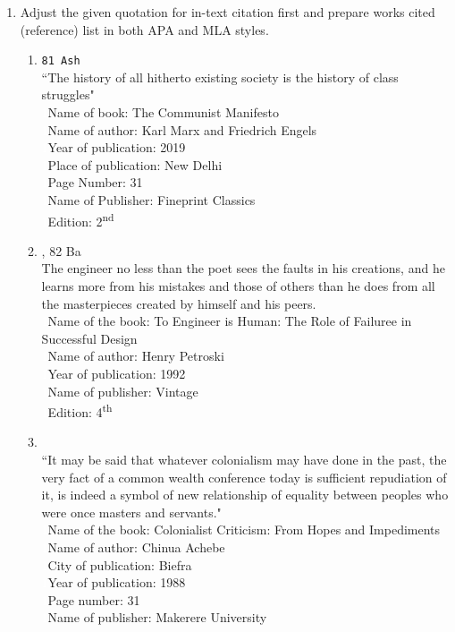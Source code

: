 \documentclass[12pt]{article}
\newcommand{\enter}{\\\textcolor{white}{1}}
\newcommand{\super}[1]{\textsuperscript{#1}}
\begin{document}
\begin{enumerate}
\begin{enumerate}
        \item 76 Ash
          \enter Name of book: Solar energy
          \enter date of publication: 1996
          \enter place of publication: U.K.
          \enter Publisher's name: Prentice Hall
          \enter Name of the author: Hughes, A.
      \end{enumerate}

    \item Adjust the given quotation for in-text citation first and prepare works cited (reference) list in both APA and MLA styles.
      \begin{enumerate}
        \item \texttt{81 Ash}\\
          ``The history of all hitherto existing society is the history of class struggles"
          \enter Name of book: The Communist Manifesto
          \enter Name of author: Karl Marx and Friedrich Engels
          \enter Year of publication: 2019
          \enter Place of publication: New Delhi
          \enter Page Number: 31
          \enter Name of Publisher: Fineprint Classics
          \enter Edition: 2\super{nd}

        \item {}, 82 Ba\\
        The engineer no less than the poet sees the faults in his creations, and he learns more from his mistakes and those of others than he does from all the masterpieces created by himself and his peers.
        \enter Name of the book: To Engineer is Human: The Role of Failuree in Successful Design
        \enter Name of author: Henry Petroski
        \enter Year of publication: 1992
        \enter Name of publisher: Vintage
        \enter Edition: 4\super{th}

        \item {}\\
          ``It may be said that whatever colonialism may have done in the past, the very fact of a common wealth conference today is sufficient repudiation of it, is indeed a symbol of new relationship of equality between peoples who were once masters and servants."
          \enter Name of the book: Colonialist Criticism: From Hopes and Impediments
          \enter Name of author: Chinua Achebe
          \enter City of publication: Biefra
          \enter Year of publication: 1988
          \enter Page number: 31
          \enter Name of publisher: Makerere University  


\end{enumerate}
\end{enumerate}
\end{document}
